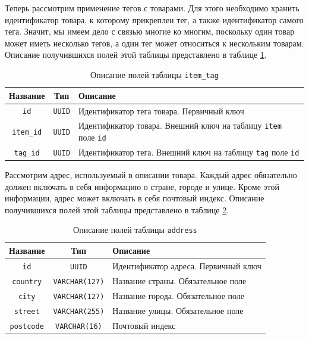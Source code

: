 \documentclass[a4paper,14pt]{extarticle}
\begin{document}
Теперь рассмотрим применение тегов с товарами. Для этого необходимо хранить идентификатор товара, к которому прикреплен тег, а также идентификатор самого тега. Значит, мы имеем дело с связью многие ко многим, поскольку один товар может иметь несколько тегов, а один тег может относиться к нескольким товарам. Описание получившихся полей этой таблицы представлено в таблице \ref{tab:item_tag}.

\begin{center}
    \begin{longtable}{|c|c|>{\centering\arraybackslash}m{11.9cm}|}
        \caption{Описание полей таблицы \texttt{item\_tag}}
        \label{tab:item_tag}
        \\
        \hline
        \textbf{Название} & \textbf{Тип}  & \textbf{Описание}                                                            \\
        \hline
        \texttt{id}       & \texttt{UUID} & Идентификатор тега товара. Первичный ключ                                    \\
        \hline
        \texttt{item\_id} & \texttt{UUID} & Идентификатор товара. Внешний ключ на таблицу \texttt{item} поле \texttt{id} \\
        \hline
        \texttt{tag\_id}  & \texttt{UUID} & Идентификатор тега. Внешний ключ на таблицу \texttt{tag} поле \texttt{id}    \\
        \hline
    \end{longtable}
\end{center}

Рассмотрим адрес, используемый в описании товара. Каждый адрес обязательно должен включать в себя информацию о стране, городе и улице. Кроме этой информации, адрес может включать в себя почтовый индекс. Описание получившихся полей этой таблицы представлено в таблице \ref{tab:address}.

\begin{center}
    \begin{longtable}{|c|c|>{\centering\arraybackslash}m{9.9cm}|}
        \caption{Описание полей таблицы \texttt{address}}
        \label{tab:address}
        \\
        \hline
        \textbf{Название} & \textbf{Тип}          & \textbf{Описание}                    \\
        \hline
        \texttt{id}       & \texttt{UUID}         & Идентификатор адреса. Первичный ключ \\
        \hline
        \texttt{country}  & \texttt{VARCHAR(127)} & Название страны. Обязательное поле   \\
        \hline
        \texttt{city}     & \texttt{VARCHAR(127)} & Название города. Обязательное поле   \\
        \hline
        \texttt{street}   & \texttt{VARCHAR(255)} & Название улицы. Обязательное поле    \\
        \hline
        \texttt{postcode} & \texttt{VARCHAR(16)}  & Почтовый индекс                      \\
        \hline
    \end{longtable}
\end{center}
\end{document}
